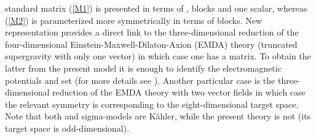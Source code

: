 \documentclass[a4paper,12pt]{article}
\begin{document}
standard matrix (\ref{M1}) is presented in terms of \coordHE{},
\coordHE{} blocks and one scalar, whereas (\ref{M2}) is
parameterized more symmetrically in terms of \coordHE{} blocks.
New representation provides a direct link to the
three-dimensional reduction of the four-dimensional
Einstein-Maxwell-Dilaton-Axion (EMDA) theory \cite{GaKe96}
(truncated \coordHE{} supergravity with only one vector) in which
case one has a \coordHE{} matrix. To obtain the latter from the
present model it is enough to identify the electromagnetic
potentials \coordHE{} and set \coordHE{} (for more
details see \cite{ClGa01}). Another particular case is the
three-dimensional reduction of the EMDA theory with two vector
fields in which case the relevant symmetry is \coordHE{}
\cite{GaSh97} corresponding to the eight-dimensional target
space. Note that both \coordHE{} and \coordHE{} sigma-models are
K\"ahler, while the present theory is not (its target space is
odd-dimensional).
\end{document}
